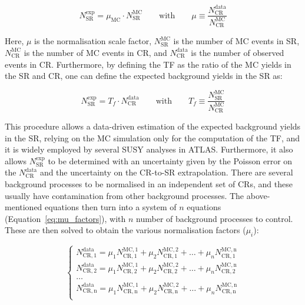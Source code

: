 		\begin{equation}
			N_{\mathrm{SR}}^{\mathrm{exp}} = \mu_{\mathrm{MC}} \cdot N_{\mathrm{SR}}^{\mathrm{MC}} \qquad \mathrm{with}\qquad \mu \equiv \frac{N_{\mathrm{CR}}^{\mathrm{data}}}{N_{\mathrm{CR}}^{\mathrm{MC}}} 
		\label{eq:exp_bkgyield}
		\end{equation}

		\noindent Here, $\mu$ is the normalisation scale factor, $N_{\mathrm{SR}}^{\mathrm{MC}}$ is the number of \ac{MC} events in \ac{SR}, $N_{\mathrm{CR}}^{\mathrm{MC}}$ is the number of \ac{MC} events in \ac{CR}, and $N_{\mathrm{CR}}^{\mathrm{data}}$ is the number of observed events in \ac{CR}. Furthermore, by defining the \ac{TF} as the ratio of the \ac{MC} yields in the \ac{SR} and \ac{CR}, one can define the expected background yields in the \ac{SR} as: 
		
		\begin{equation}
			N_{\mathrm{SR}}^{\mathrm{exp}} = T_f \cdot N_{\mathrm{CR}}^{\mathrm{data}} \qquad \mathrm{with} \qquad T_f \equiv \frac{N_{\mathrm{SR}}^{\mathrm{MC}}}{N_{\mathrm{CR}}^{\mathrm{MC}}}
		\label{eq:tf}
		\end{equation}

		\noindent This procedure allows a data-driven estimation of the expected background yields in the \ac{SR}, relying on the \ac{MC} simulation only for the computation of the \ac{TF}, and it is widely employed by several \ac{SUSY} analyses in \ac{ATLAS}. Furthermore, it also allows $N_{\mathrm{SR}}^{\mathrm{exp}}$ to be determined with an uncertainty given by the Poisson error on the $N_{\mathrm{CR}}^{\mathrm{data}}$ and the uncertainty on the \ac{CR}-to-\ac{SR} extrapolation. There are several background processes to be normalised in an independent set of \acp{CR}, and these usually have contamination from other background processes. The above-mentioned equations then turn into a system of $n$ equations (Equation~\ref{eq:mu_factors}), with $n$ number of background processes to control. These are then solved to obtain the various normalisation factors ($\mu_i$):

		\begin{equation}
			\begin{cases}
				N_{\mathrm{CR,1}}^{\mathrm{data}} = \mu_1 N_{\mathrm{CR,1}}^{\mathrm{MC,1}} + \mu_2 N_{\mathrm{CR,1}}^{\mathrm{MC,2}} + \dots + \mu_n N_{\mathrm{CR,1}}^{\mathrm{MC,n}} \\
				N_{\mathrm{CR,2}}^{\mathrm{data}} = \mu_1 N_{\mathrm{CR,2}}^{\mathrm{MC,1}} + \mu_2 N_{\mathrm{CR,2}}^{\mathrm{MC,2}} + \dots + \mu_n N_{\mathrm{CR,2}}^{\mathrm{MC,n}} \\
				\dots \\
				N_{\mathrm{CR,n}}^{\mathrm{data}} = \mu_1 N_{\mathrm{CR,n}}^{\mathrm{MC,1}} + \mu_2 N_{\mathrm{CR,n}}^{\mathrm{MC,2}} + \dots + \mu_n N_{\mathrm{CR,n}}^{\mathrm{MC,n}} \\
			\end{cases}
		\label{eq:mu_factors}
		\end{equation}

